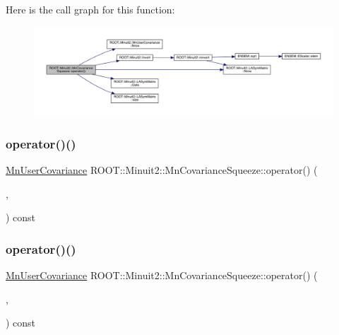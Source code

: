 Here is the call graph for this function\+:
\nopagebreak
\begin{figure}[H]
\begin{center}
\leavevmode
\includegraphics[width=350pt]{dc/d44/classROOT_1_1Minuit2_1_1MnCovarianceSqueeze_af75da2b8e6e20a5477a6b0ceac4efb3a_cgraph}
\end{center}
\end{figure}
\mbox{\label{classROOT_1_1Minuit2_1_1MnCovarianceSqueeze_af75da2b8e6e20a5477a6b0ceac4efb3a}} 
\subsubsection{\texorpdfstring{operator()()}{operator()()}\hspace{0.1cm}{\footnotesize\ttfamily [2/9]}}
{\footnotesize\ttfamily \mbox{\hyperlink{classROOT_1_1Minuit2_1_1MnUserCovariance}{Mn\+User\+Covariance}} R\+O\+O\+T\+::\+Minuit2\+::\+Mn\+Covariance\+Squeeze\+::operator() (\begin{DoxyParamCaption}\item[{const \mbox{\hyperlink{classROOT_1_1Minuit2_1_1MnUserCovariance}{Mn\+User\+Covariance}} \&}]{,  }\item[{unsigned int}]{ }\end{DoxyParamCaption}) const}

\mbox{\label{classROOT_1_1Minuit2_1_1MnCovarianceSqueeze_af75da2b8e6e20a5477a6b0ceac4efb3a}} 
\subsubsection{\texorpdfstring{operator()()}{operator()()}\hspace{0.1cm}{\footnotesize\ttfamily [3/9]}}
{\footnotesize\ttfamily \mbox{\hyperlink{classROOT_1_1Minuit2_1_1MnUserCovariance}{Mn\+User\+Covariance}} R\+O\+O\+T\+::\+Minuit2\+::\+Mn\+Covariance\+Squeeze\+::operator() (\begin{DoxyParamCaption}\item[{const \mbox{\hyperlink{classROOT_1_1Minuit2_1_1MnUserCovariance}{Mn\+User\+Covariance}} \&}]{,  }\item[{unsigned int}]{ }\end{DoxyParamCaption}) const}

